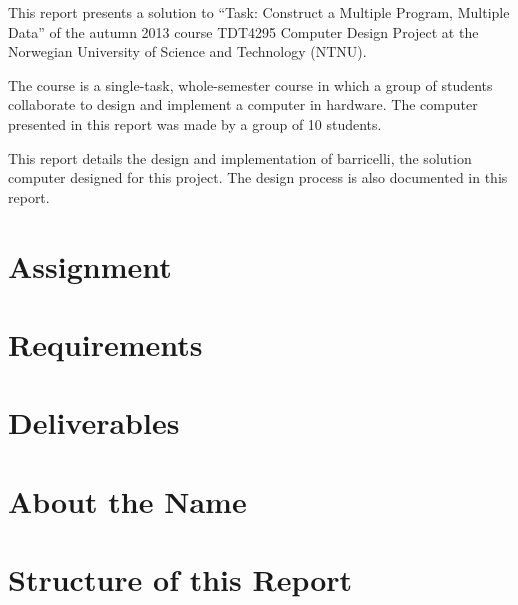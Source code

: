 This report presents a solution to ``Task: Construct a Multiple Program, Multiple Data'' of the autumn 2013 course TDT4295 Computer Design Project at the Norwegian University of Science and Technology (NTNU).

The course is a single-task, whole-semester course in which a group of students collaborate to design and implement a computer in hardware.
The computer presented in this report was made by a group of 10 students.

This report details the design and implementation of \Gls{barricelli}, the solution computer designed for this project.
The design process is also documented in this report.

\section{Assignment}



\section{Requirements}
\label{section:requirements}



\section{Deliverables}



\section{About the Name}



\section{Structure of this Report}



